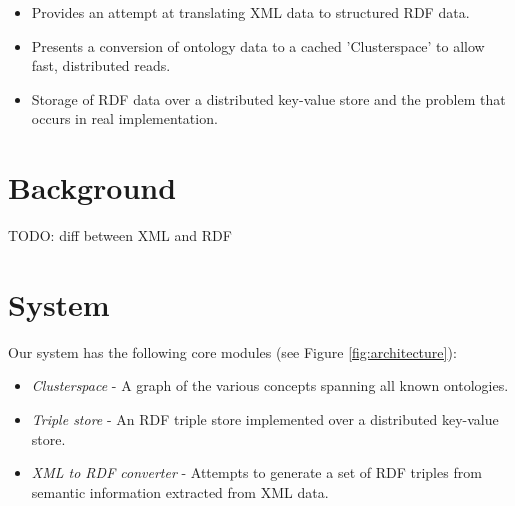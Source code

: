 \documentclass[conference]{IEEEtran}
\begin{document}
\begin{itemize}
    \item Provides an attempt at translating XML data to structured RDF data.
    \item Presents a conversion of ontology data to a cached 'Clusterspace' to
        allow fast, distributed reads.
    \item Storage of RDF data over a distributed key-value store and the
        problem that occurs in real implementation.
\end{itemize}

\section{Background}
\label{sec:background}


TODO: diff between XML and RDF

\section{System}
Our system has the following core modules (see Figure \ref{fig:architecture}):

\begin{itemize}
    \item \emph{Clusterspace} - A graph of the various concepts spanning all
        known ontologies.
    \item \emph{Triple store} - An RDF triple store implemented over a distributed key-value store.
    \item \emph{XML to RDF converter} - Attempts to generate a set of RDF
        triples from semantic information extracted from XML data.
\end{itemize}
\end{document}
